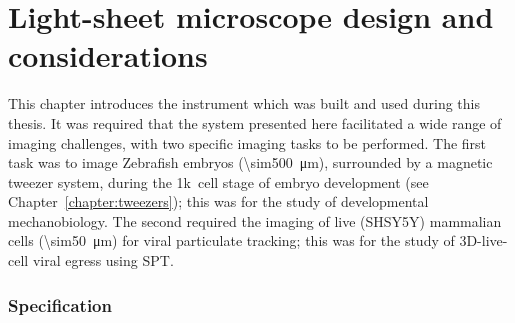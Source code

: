 

\ifpdf
    \graphicspath{{Chapters/design/Figs/Raster/}{Chapters/design/Figs/PDF/}{Chapters/design/Figs/}}
\else
    \graphicspath{{Chapters/design/Figs/Vector/}{Chapters/design/Figs/}}
\fi



\chapter{Light-sheet microscope design and considerations }\label{chapter:design}


This chapter introduces the instrument which was built and used during this thesis.
It was required that the system presented here facilitated a wide range of imaging challenges, with two specific %
imaging tasks to be performed.
The first %
task was to image Zebrafish embryos (\SI{\sim500}{\micro\meter}), surrounded by a magnetic tweezer system, during the \SI{1}{}k~cell stage of embryo development (see Chapter~\ref{chapter:tweezers}); this was for the study of developmental mechanobiology.
The second required the imaging of live (SHSY5Y) mammalian cells (\SI{\sim50}{\micro\meter}) for viral particulate tracking; this was for the study of 3D-live-cell viral egress using SPT.\@
\pagebreak
\subsection*{Specification}

